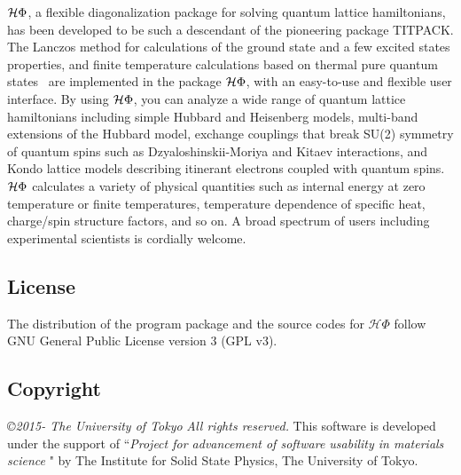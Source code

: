 $\mathcal{H} \Phi$, a flexible diagonalization package for solving quantum lattice hamiltonians,
has been developed to be such a descendant of the pioneering package TITPACK.
The Lanczos method for calculations of the ground state and a few excited states properties,
and finite temperature calculations based on thermal pure quantum states~\cite{Sugiura2012} are implemented in
the package $\mathcal{H} \Phi$, with an easy-to-use and flexible user interface.
By using $\mathcal{H} \Phi$, you can analyze a wide range of quantum lattice hamiltonians including
simple Hubbard and Heisenberg models, multi-band extensions of the Hubbard model,
exchange couplings that break SU(2) symmetry of quantum spins such as Dzyaloshinskii-Moriya
and Kitaev interactions, and Kondo lattice models describing itinerant electrons coupled with
quantum spins. $\mathcal{H} \Phi$ calculates a variety of physical quantities such as internal energy at zero temperature or finite temperatures, temperature dependence of specific heat, charge/spin structure factors, and so on. A broad spectrum of users including experimental scientists is cordially welcome.

\subsection{License}
The distribution of the program package and the source codes for ${\mathcal H \Phi}$ follow GNU General Public License version 3 (GPL v3). 
\subsection{Copyright}
{\it \copyright 2015- The University of Tokyo} {\it  All rights reserved.}
This software is developed under the support of ``{\it Project for advancement of software usability in materials science }" by The Institute for Solid State Physics, The University of Tokyo. 

